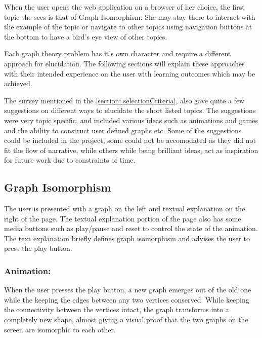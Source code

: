 When the user opens the web application on a browser of her choice, the first
topic she sees is that of Graph Isomorphism. She may stay there to interact
with the example of the topic or navigate to other topics using navigation
buttons at the bottom to have a bird's eye view of other topics.

Each graph theory problem has it's own character and require a different
approach for elucidation. The following sections will explain these approaches
with their intended experience on the user with learning outcomes which may be
achieved.

The survey mentioned in the \autoref{section: selectionCriteria}, also gave
quite a few suggestions on different ways to elucidate the short listed topics.
The suggestions were very topic specific, and included various ideas such as
animations and games and the ability to construct user defined graphs etc. Some
of the suggestions could be included in the project, some could not be
accomodated as they did not fit the flow of narrative, while others while being
brilliant ideas, act as inspiration for future work due to constraints of time.

\subsection{Graph Isomorphism}
\label{story: isomorphism}
The user is presented with a graph on the left and textual explanation on the
right of the page.  The textual explanation portion of the page also has some
media buttons such as play/pause and reset to control the state of the
animation. The text explanation briefly defines graph isomorphism and advises
the user to press the play button.

\subsubsection{Animation:}
When the user presses the play button, a new graph emerges out of the old one
while the keeping the edges between any two vertices conserved. 
While keeping the connectivity between the vertices intact, the graph
transforms into a completely new shape, almost giving a visual proof that the
two graphs on the screen are isomorphic to each other.

